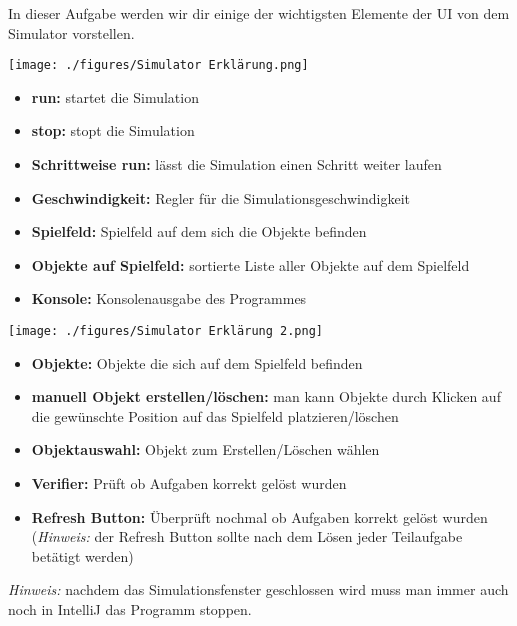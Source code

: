 
\label{ex4}

In dieser Aufgabe werden wir dir einige der wichtigsten Elemente der UI von dem Simulator vorstellen.
\begin{center}
    \texttt{[image: ./figures/Simulator Erklärung.png]}
\end{center}
\begin{itemize}
    \item \textbf{run:} startet die Simulation
    \item \textbf{stop:} stopt die Simulation
    \item \textbf{Schrittweise run:} lässt die Simulation einen Schritt weiter laufen
    \item \textbf{Geschwindigkeit:} Regler für die Simulationsgeschwindigkeit
    \item \textbf{Spielfeld:} Spielfeld auf dem sich die Objekte befinden
    \item \textbf{Objekte auf Spielfeld:} sortierte Liste aller Objekte auf dem Spielfeld
    \item \textbf{Konsole:} Konsolenausgabe des Programmes
\end{itemize}
\newpage
\begin{center}
    \texttt{[image: ./figures/Simulator Erklärung 2.png]}
\end{center}
\begin{itemize}
    \item \textbf{Objekte:} Objekte die sich auf dem Spielfeld befinden
    \item \textbf{manuell Objekt erstellen/löschen:} man kann Objekte durch Klicken auf die gewünschte Position auf das Spielfeld platzieren/löschen
    \item \textbf{Objektauswahl:} Objekt zum Erstellen/Löschen wählen
    \item \textbf{Verifier:} Prüft ob Aufgaben korrekt gelöst wurden
    \item \textbf{Refresh Button:} Überprüft nochmal ob Aufgaben korrekt gelöst wurden (\textit{Hinweis:} der Refresh Button sollte nach dem Lösen jeder Teilaufgabe betätigt werden)
\end{itemize}
\textit{Hinweis:} nachdem das Simulationsfenster geschlossen wird muss man immer auch noch in IntelliJ das Programm stoppen.
